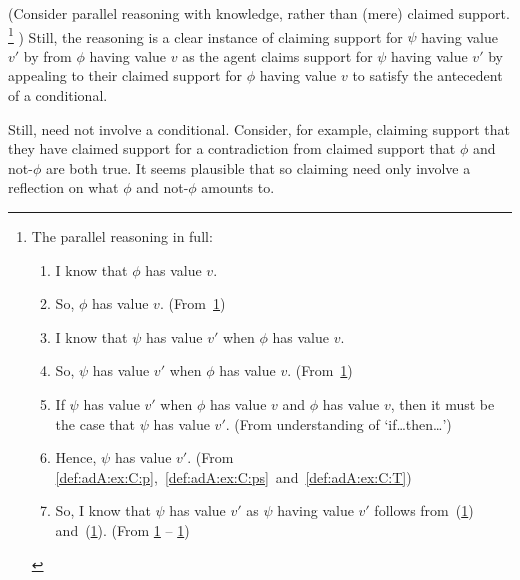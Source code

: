 \begin{note}
  (Consider parallel reasoning with knowledge, rather than (mere) claimed support.\nolinebreak
  \footnote{The parallel reasoning in full:
    \begin{enumerate}[label=\arabic*., ref=\arabic*]
    \item\label{def:adA:ex:K:Kp} I know that \(\phi\) has value \(v\).
    \item\label{def:adA:ex:K:p} So, \(\phi\) has value \(v\). \hfill (From~\ref{def:adA:ex:K:Kp})
    \item\label{def:adA:ex:K:Kps} I know that \(\psi\) has value \(v'\) when \(\phi\) has value \(v\).
    \item\label{def:adA:ex:K:ps} So, \(\psi\) has value \(v'\) when \(\phi\) has value \(v\). \hfill(From~\ref{def:adA:ex:K:Kps})
    \item\label{def:adA:ex:K:T} If \(\psi\) has value \(v'\) when \(\phi\) has value \(v\) and \(\phi\) has value \(v\), then it must be the case that \(\psi\) has value \(v'\). \hfill (From understanding of `if\dots then\dots')
    \item\label{def:adA:ex:K:s} Hence, \(\psi\) has value \(v'\). \hfill (From \ref{def:adA:ex:C:p},~\ref{def:adA:ex:C:ps}~and~\ref{def:adA:ex:C:T})
    \item So, I know that \(\psi\) has value \(v'\) as \(\psi\) having value \(v'\) follows from~(\ref{def:adA:ex:K:Kp}) and~(\ref{def:adA:ex:K:Kps}).
      \mbox{}\hfill (From \ref{def:adA:ex:K:Kp} -- \ref{def:adA:ex:K:s})
    \end{enumerate}
  }%
  )
  Still, the reasoning is a clear instance of claiming support for \(\psi\) having value \(v'\) by \adA{} from \(\phi\) having value \(v\) as the agent claims support for \(\psi\) having value \(v'\) by appealing to their claimed support for \(\phi\) having value \(v\) to satisfy the antecedent of a conditional.

  Still, \adA{} need not involve a conditional.
  Consider, for example, claiming support that they have claimed support for a contradiction from claimed support that \(\phi\) and not-\(\phi\) are both true.
  It seems plausible that so claiming need only involve a reflection on what \(\phi\) and not-\(\phi\) amounts to.
\end{note}

